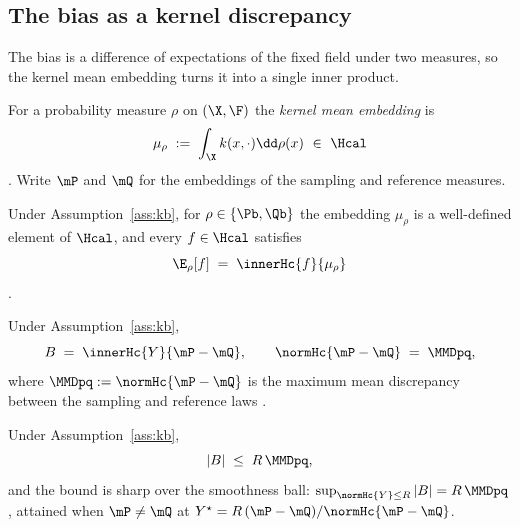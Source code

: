 \subsection{The bias as a kernel discrepancy}
\label{sec:kb-representer}

The bias is a difference of expectations of the fixed field under two measures, so
the kernel mean embedding turns it into a single inner product.

\begin{definition}
\label{def:kb-embedding}
For a probability measure $\rho$ on $(\X,\F)$ the \emph{kernel mean embedding} is
\[
  \mu_\rho \;:=\; \int_\X k(x,\cdot)\dd\rho(x)\ \in\ \Hcal
\]
\citep[Definition~3.1]{muandet2017}. Write $\mP$ and $\mQ$ for the embeddings of
the sampling and reference measures.
\end{definition}

\begin{lemma}
\label{lem:kb-mean}
Under Assumption~\ref{ass:kb}, for $\rho\in\{\Pb,\Qb\}$ the embedding $\mu_\rho$ is
a well-defined element of $\Hcal$, and every $f\in\Hcal$ satisfies
\[
  \E_{\rho}[f] \;=\; \innerHc{f}{\mu_\rho}
\]
\citep[Lemma~3.1]{muandet2017,smola2007}.
\end{lemma}

\begin{proposition}
\label{prop:kb-representer}
Under Assumption~\ref{ass:kb},
\[
  B \;=\; \innerHc{Y}{\mP-\mQ},
  \qquad
  \normHc{\mP-\mQ} \;=\; \MMDpq ,
\]
where $\MMDpq:=\normHc{\mP-\mQ}$ is the maximum mean discrepancy between the
sampling and reference laws \citep[eq.~3.29]{muandet2017,gretton2012}.
\end{proposition}

\begin{theorem}
\label{thm:kb}
Under Assumption~\ref{ass:kb},
\[
  |B|\;\le\; R\,\MMDpq ,
\]
and the bound is sharp over the smoothness ball:
$\sup_{\normHc{Y}\le R}|B|=R\,\MMDpq$, attained when $\mP\ne\mQ$ at
$Y^{\star}=R\,(\mP-\mQ)/\normHc{\mP-\mQ}$.
\end{theorem}


